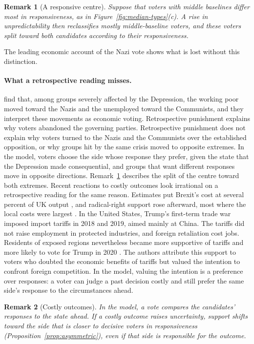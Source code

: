 \documentclass[12pt,letterpaper]{article}
\newtheorem{remark}{Remark}
\begin{document}
\begin{remark}[A responsive centre]\label{rem:centre}
Suppose that voters with middle baselines differ most in responsiveness, as in Figure~\ref{fig:median-types}(c). A rise in unpredictability then reclassifies mostly middle-baseline voters, and these voters split toward both candidates according to their responsiveness.
\end{remark}

The leading economic account of the Nazi vote shows what is lost without this distinction.

\paragraph{What a retrospective reading misses.}
\citet{King2008} find that, among groups severely affected by the Depression, the working poor moved toward the Nazis and the unemployed toward the Communists, and they interpret these movements as economic voting. Retrospective punishment explains why voters abandoned the governing parties. Retrospective punishment does not explain why voters turned to the Nazis and the Communists over the established opposition, or why groups hit by the same crisis moved to opposite extremes. In the model, voters choose the side whose response they prefer, given the state that the Depression made consequential, and groups that want different responses move in opposite directions. Remark~\ref{rem:centre} describes the split of the centre toward both extremes. Recent reactions to costly outcomes look irrational on a retrospective reading for the same reason. Estimates put Brexit's cost at several percent of UK output \citep{BornEtAl2019,AlabreseEtAl2026b}, and radical-right support rose afterward, most where the local costs were largest \citep{AlabreseEtAl2026}. In the United States, Trump's first-term trade war imposed import tariffs in 2018 and 2019, aimed mainly at China. The tariffs did not raise employment in protected industries, and foreign retaliation cost jobs. Residents of exposed regions nevertheless became more supportive of tariffs and more likely to vote for Trump in 2020 \citep{AutorBeckDornHanson2024}. The authors attribute this support to voters who doubted the economic benefits of tariffs but valued the intention to confront foreign competition. In the model, valuing the intention is a preference over responses: a voter can judge a past decision costly and still prefer the same side's response to the circumstances ahead.

\begin{remark}[Costly outcomes]\label{rem:costly}
In the model, a vote compares the candidates' responses to the state ahead. If a costly outcome raises uncertainty, support shifts toward the side that is closer to decisive voters in responsiveness (Proposition~\ref{prop:asymmetric}), even if that side is responsible for the outcome.
\end{remark}
\end{document}
